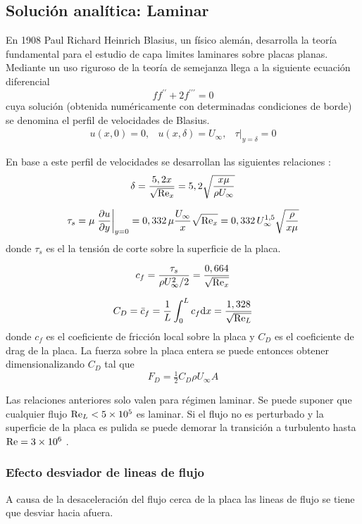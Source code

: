 \subsection{Solución analítica: Laminar}
En 1908 Paul Richard Heinrich Blasius, un físico alemán, desarrolla la teoría fundamental para el estudio de capa limites laminares sobre placas planas. Mediante un uso riguroso de la teoría de semejanza llega a la siguiente ecuación diferencial
\[
ff^{\prime\prime}+2f^{\prime\prime\prime}=0
\]
cuya solución (obtenida numéricamente con determinadas condiciones de borde) se denomina el perfil de velocidades de Blasius.
\[
\begin{array}{lll}
u(x,0)=0, & u(x,\delta)=U_\infty, & \tau|_{y=\delta} =0
\end{array}
\]

En base a este perfil de velocidades se desarrollan las siguientes relaciones \citep{durst2008fluid}:
\begin{equation}
    \delta=\frac{5,2x}{\sqrt{\textrm{Re}_x}}=5,2\sqrt{\frac{x\mu}{\rho U_\infty}}
\end{equation}

\begin{equation}
    \tau_s=\mu \left. \frac{\partial u}{\partial y}\right|_{y=0}=0,332\,\mu\frac{U_\infty}{x}\sqrt{\textrm{Re}_x}=0,332\, U_\infty^{1,5}\sqrt{\frac{\rho}{x\mu}}
\end{equation}
donde $\tau_s$ es el la tensión de corte sobre la superficie de la placa. 

\begin{equation}
    c_f=\frac{\tau_s}{\rho U_\infty^2/2}=\frac{0,664}{\sqrt{\textrm{Re}_x}}
\end{equation}

\begin{equation}
    C_D=\bar{c}_f=\frac{1}{L}\int_0^Lc_f\textrm{d} x=\frac{1,328}{\sqrt{\textrm{Re}_L}}
\end{equation}
donde $c_f$ es el coeficiente de fricción local sobre la placa y $C_D$ es el coeficiente de drag de la placa. La fuerza sobre la placa entera se puede entonces obtener dimensionalizando $C_D$ tal que
\[
F_D=\tfrac{1}{2}C_D \rho U_\infty A
\]

Las relaciones anteriores solo valen para régimen laminar. Se puede suponer que cualquier flujo $\textrm{Re}_L<\num{5e5}$ es laminar. Si el flujo no es perturbado y la superficie de la placa es pulida se puede demorar la transición a turbulento hasta $\textrm{Re}=\num{3e6}$ \citep{kreith2011principles}.

\subsubsection*{Efecto desviador de lineas de flujo}
A causa de la desaceleración del flujo cerca de la placa las lineas de flujo se tiene que desviar hacia afuera. 

